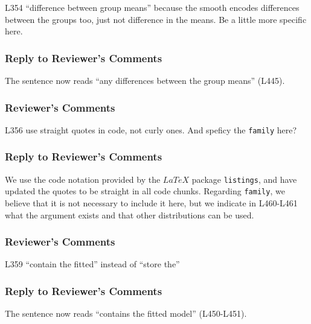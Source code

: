 \documentclass[
]{article}
\newcommand{\passthrough}[1]{#1}
\begin{document}
L354 ``difference between group means'' because the smooth encodes differences between the groups too, just not difference in the means. Be a little more specific here.

\hypertarget{section-26}{%
\subsubsection{\texorpdfstring{\textcolor{reviewersblue} {Reply to Reviewer's Comments}}{}}\label{section-26}}

The sentence now reads ``any differences between the group means'' (L445).

\hypertarget{reviewers-comments-26}{%
\subsubsection{Reviewer's Comments}\label{reviewers-comments-26}}

L356 use straight quotes in code, not curly ones. And speficy the \passthrough{\lstinline!family!} here?

\hypertarget{section-27}{%
\subsubsection{\texorpdfstring{\textcolor{reviewersblue} {Reply to Reviewer's Comments}}{}}\label{section-27}}

We use the code notation provided by the \(LaTeX\) package \passthrough{\lstinline!listings!}, and have updated the quotes to be straight in all code chunks. Regarding \passthrough{\lstinline!family!}, we believe that it is not necessary to include it here, but we indicate in L460-L461 what the argument exists and that other distributions can be used.

\hypertarget{reviewers-comments-27}{%
\subsubsection{Reviewer's Comments}\label{reviewers-comments-27}}

L359 ``contain the fitted'' instead of ``store the''

\hypertarget{section-28}{%
\subsubsection{\texorpdfstring{\textcolor{reviewersblue} {Reply to Reviewer's Comments}}{}}\label{section-28}}

The sentence now reads ``contains the fitted model'' (L450-L451).
\end{document}

